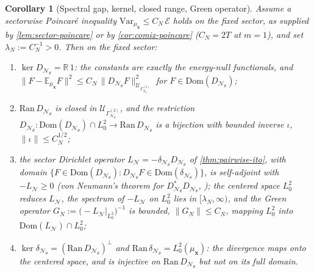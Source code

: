 \documentclass[reqno,final,11pt]{amsart}
\theoremstyle{plain}
\newtheorem{corollary}[theorem]{Corollary}
\theoremstyle{definition}
\theoremstyle{remark}
\newcommand{\R}{\mathbb R}
\newcommand{\E}{\mathbb E}
\newcommand{\Dom}{\mathrm{Dom}}
\newcommand{\cE}{\mathcal E}
\newcommand{\cN}{\mathcal N}
\newcommand{\cU}{\mathcal U}
\newcommand{\GamN}{\Gamma^{(2)}_{\cN_\theta}}
\newcommand{\DN}{D_{\cN_\theta}}
\newcommand{\divN}{\delta_{\cN_\theta}}
\newcommand{\Ltwoz}{L^2_0}
\begin{document}
\begin{corollary}[Spectral gap, kernel, closed range, Green operator]\label{cor:co-gap}
Assume a sectorwise Poincar\'e inequality
$\mathrm{Var}_{\mu_{\mathbf x}}\le C_N\,\cE$ holds on the fixed sector, as
supplied by \cref{lem:sector-poincare} or by \cref{cor:comix-poincare}
($C_N=2T$ at $m=1$), and set $\lambda_N:=C_N^{-1}>0$. Then on the fixed
sector:
\begin{enumerate}
\item[$(\mathrm i)$] $\ker\DN=\R\,1$: the constants are exactly the energy-null
functionals, and $\|F-\E_{\mu_{\mathbf x}}F\|^2\le C_N\,\|\DN F\|^2_{\cU_{\GamN}}$
for $F\in\Dom(\DN)$;
\item[$(\mathrm{ii})$] $\mathrm{Ran}\,\DN$ is closed in $\cU_{\GamN}$, and the
restriction $\DN\colon\Dom(\DN)\cap\Ltwoz\to\mathrm{Ran}\,\DN$ is a bijection
with bounded inverse $\iota$, $\|\iota\|\le C_N^{1/2}$;
\item[$(\mathrm{iii})$] the sector Dirichlet operator $L_{\cN}=-\divN\DN$ of
\cref{thm:pairwise-ito}, with domain
$\{F\in\Dom(\DN):\DN F\in\Dom(\divN)\}$, is self-adjoint with $-L_{\cN}\ge0$
(von Neumann's theorem for $\DN^{*}\DN$, \citep[Ch.~5]{Schmuedgen}); the centered
space $\Ltwoz$ reduces $L_{\cN}$, the spectrum of $-L_{\cN}$ on $\Ltwoz$ lies in
$[\lambda_N,\infty)$, and the Green operator
$G_N:=\bigl(-L_{\cN}|_{\Ltwoz}\bigr)^{-1}$ is bounded, $\|G_N\|\le C_N$, mapping
$\Ltwoz$ into $\Dom(L_{\cN})\cap\Ltwoz$;
\item[$(\mathrm{iv})$] $\ker\divN=(\mathrm{Ran}\,\DN)^{\perp}$ and
$\mathrm{Ran}\,\divN=\Ltwoz(\mu_{\mathbf x})$: the divergence maps onto the
centered space, and is injective on $\mathrm{Ran}\,\DN$ but not on its full
domain.
\end{enumerate}
\end{corollary}
\end{document}
